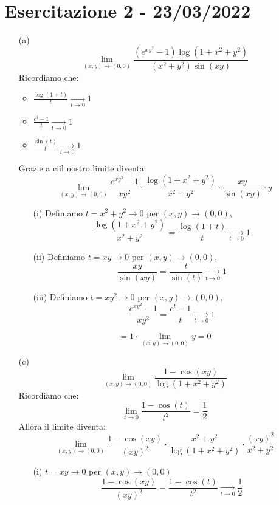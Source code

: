 \section{Esercitazione 2 - 23/03/2022}
\begin{eexercise}
  \begin{enumerate}
    \item[(a)] $$\lim_{(x,y)\to (0,0)} \frac{(e^{xy^2}-1)\log(1+x^2+y^2)}{(x^2+y^2)\sin(xy)}$$
          Ricordiamo che: 
          \begin{itemize}
            \item $\frac{\log(1+t)}{t} \xrightarrow[t\to 0]{} 1$
            \item $\frac{e^t-1}{t} \xrightarrow[t\to 0]{} 1$
            \item $\frac{\sin(t)}{t} \xrightarrow[t\to 0]{} 1$
          \end{itemize}
          Grazie a ci\aco il nostro limite diventa:
          $$\lim_{(x,y)\to (0,0)} \frac{e^{xy^2}-1}{xy^2} \cdot \frac{\log(1+x^2+y^2)}{x^2+y^2}\cdot \frac{xy}{\sin(xy)} \cdot y$$
          \begin{enumerate}
            \item[(i)] Definiamo $t = x^2+y^2 \rightarrow 0$ per $(x,y) \to (0,0)$, 
                      $$\frac{\log(1+x^2+y^2)}{x^2+y^2} = \frac{\log(1+t)}{t} \xrightarrow[t\to 0]{} 1$$
            \item[(ii)]  Definiamo $t = xy \rightarrow 0$ per $(x,y) \to (0,0)$, 
                      $$ \frac{xy}{\sin(xy)} = \frac{t}{\sin(t)} \xrightarrow[t\to 0]{} 1$$
            \item[(iii)] Definiamo $t = xy^2 \rightarrow 0$ per $(x,y) \to (0,0)$,
                      $$ \frac{e^{xy^2}-1}{xy^2} = \frac{e^t-1}{t} \xrightarrow[t\to 0]{} 1$$ 
          \end{enumerate}
          $$= 1\cdot \lim_{(x,y)\to (0,0)} y = 0$$
    \item[(c)] $$\lim_{(x,y) \to (0,0)} \frac{1-\cos(xy)}{\log(1+x^2+y^2)}$$
            Ricordiamo che: $$\lim_{t\to 0} \frac{1-\cos(t)}{t^2} = \frac{1}{2}$$
            Allora il limite diventa: 
            $$\lim_{(x,y)\to (0,0)}\frac{1-\cos(xy)}{(xy)^2}\cdot \frac{x^2+y^2}{\log(1+x^2+y^2)} \cdot \frac{(xy)^2}{x^2+y^2}$$
            \begin{itemize}
              \item[(i)] $t = xy \rightarrow 0$ per $(x,y)\to (0,0)$
                          $$\frac{1-\cos(xy)}{(xy)^2} = \frac{1-\cos(t)}{t^2} \xrightarrow[t\to 0]{} \frac{1}{2}$$

\end{itemize}
\end{enumerate}
\end{eexercise}

